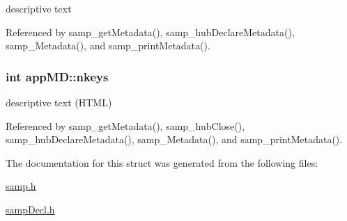 descriptive text 

Referenced by samp\_\-getMetadata(), samp\_\-hubDeclareMetadata(), samp\_\-Metadata(), and samp\_\-printMetadata().\hypertarget{structappMD_4b9f5ebb7d20beb53a7bfe192009e89a}{
\subsubsection[{nkeys}]{\setlength{\rightskip}{0pt plus 5cm}int {\bf appMD::nkeys}}}
\label{structappMD_4b9f5ebb7d20beb53a7bfe192009e89a}


descriptive text (HTML) 

Referenced by samp\_\-getMetadata(), samp\_\-hubClose(), samp\_\-hubDeclareMetadata(), samp\_\-Metadata(), and samp\_\-printMetadata().

The documentation for this struct was generated from the following files:\begin{CompactItemize}
\item 
\hyperlink{samp_8h}{samp.h}\item 
\hyperlink{sampDecl_8h}{sampDecl.h}\end{CompactItemize}
